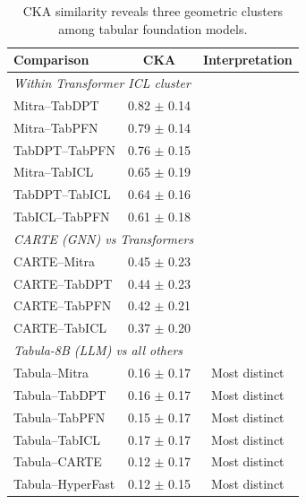 \begin{table}[t]
\centering
\caption{CKA similarity reveals three geometric clusters among tabular foundation models.}
\label{tab:cka_clusters}
\small
\begin{tabular}{lcc}
\toprule
Comparison & CKA & Interpretation \\
\midrule
\multicolumn{3}{l}{\textit{Within Transformer ICL cluster}} \\
Mitra--TabDPT & 0.82 $\pm$ 0.14 & \\
Mitra--TabPFN & 0.79 $\pm$ 0.14 & \\
TabDPT--TabPFN & 0.76 $\pm$ 0.15 & \\
Mitra--TabICL & 0.65 $\pm$ 0.19 & \\
TabDPT--TabICL & 0.64 $\pm$ 0.16 & \\
TabICL--TabPFN & 0.61 $\pm$ 0.18 & \\
\midrule
\multicolumn{3}{l}{\textit{CARTE (GNN) vs Transformers}} \\
CARTE--Mitra & 0.45 $\pm$ 0.23 & \\
CARTE--TabDPT & 0.44 $\pm$ 0.23 & \\
CARTE--TabPFN & 0.42 $\pm$ 0.21 & \\
CARTE--TabICL & 0.37 $\pm$ 0.20 & \\
\midrule
\multicolumn{3}{l}{\textit{Tabula-8B (LLM) vs all others}} \\
Tabula--Mitra & 0.16 $\pm$ 0.17 & Most distinct \\
Tabula--TabDPT & 0.16 $\pm$ 0.17 & Most distinct \\
Tabula--TabPFN & 0.15 $\pm$ 0.17 & Most distinct \\
Tabula--TabICL & 0.17 $\pm$ 0.17 & Most distinct \\
Tabula--CARTE & 0.12 $\pm$ 0.17 & Most distinct \\
Tabula--HyperFast & 0.12 $\pm$ 0.15 & Most distinct \\
\bottomrule
\end{tabular}
\end{table}